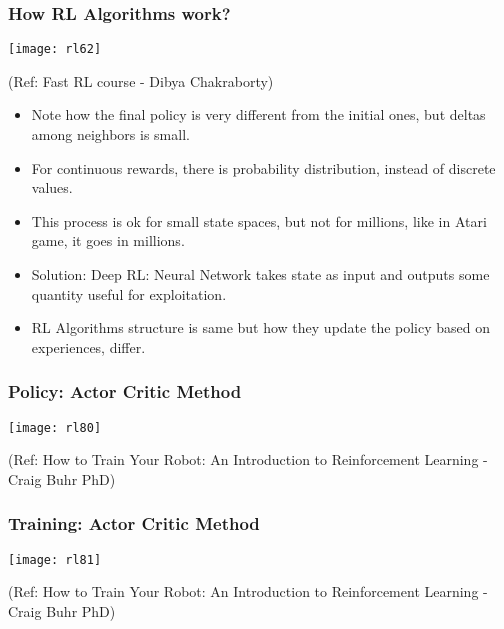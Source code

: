 \begin{frame}[fragile]\frametitle{How RL Algorithms work?}

\begin{center}
\texttt{[image: rl62]}

{\tiny (Ref: Fast RL course - Dibya Chakraborty)}
\end{center}

\begin{itemize}
\item Note how the final policy is very different from the initial ones, but deltas among neighbors is small.
\item For continuous rewards, there is probability distribution, instead of discrete values.
\item This process is ok for small state spaces, but not for millions, like in Atari game, it goes in millions. 
\item Solution: Deep RL: Neural Network takes state as input and outputs some quantity useful for exploitation.
\item RL Algorithms structure is same but how they update the policy based on experiences, differ.
\end{itemize}
\end{frame}


\begin{frame}[fragile]\frametitle{Policy: Actor Critic Method}


\begin{center}
\texttt{[image: rl80]}
\end{center}

{\tiny (Ref: How to Train Your Robot: An Introduction to Reinforcement Learning - Craig Buhr PhD)}

\end{frame}

\begin{frame}[fragile]\frametitle{Training: Actor Critic Method}


\begin{center}
\texttt{[image: rl81]}
\end{center}

{\tiny (Ref: How to Train Your Robot: An Introduction to Reinforcement Learning - Craig Buhr PhD)}

\end{frame}


